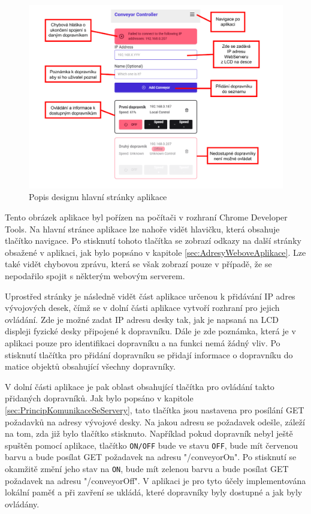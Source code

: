 \begin{figure}[H]
	\centering
	\includegraphics[width=1\linewidth]{images/LandingPage_Annot.drawio.pdf}
	\caption{Popis designu hlavní stránky aplikace}
	\label{fig:LandingPageAnnotated}
\end{figure}

Tento obrázek aplikace byl pořízen na počítači v rozhraní Chrome Developer Tools. Na hlavní stránce aplikace lze nahoře vidět hlavičku, která obsahuje tlačítko navigace. Po stisknutí tohoto tlačítka se zobrazí odkazy na další stránky obsažené v aplikaci, jak bylo popsáno v kapitole \ref{sec:AdresyWeboveAplikace}. Lze také vidět chybovou zprávu, která se však zobrazí pouze v případě, že se nepodařilo spojit s některým webovým serverem.

Uprostřed stránky je následně vidět část aplikace určenou k přidávání IP adres vývojových desek, čímž se v dolní části aplikace vytvoří rozhraní pro jejich ovládání. Zde je možné zadat IP adresu desky tak, jak je napsaná na LCD displeji fyzické desky připojené k dopravníku. Dále je zde poznámka, která je v aplikaci pouze pro identifikaci dopravníku a na funkci nemá žádný vliv. Po stisknutí tlačítka pro přidání dopravníku se přidají informace o dopravníku do matice objektů obsahující všechny dopravníky.

V dolní části aplikace je pak oblast obsahující tlačítka pro ovládání takto přidaných dopravníků. Jak bylo popsáno v kapitole \ref{sec:PrincipKomunikaceSeServery}, tato tlačítka jsou nastavena pro posílání GET požadavků na adresy vývojové desky. Na jakou adresu se požadavek odešle, záleží na tom, zda již bylo tlačítko stisknuto. Například pokud dopravník nebyl ještě spuštěn pomocí aplikace, tlačítko \texttt{ON/OFF} bude ve stavu \texttt{OFF}, bude mít červenou barvu a bude posílat GET požadavek na adresu "/conveyorOn". Po stisknutí se okamžitě změní jeho stav na \texttt{ON}, bude mít zelenou barvu a bude posílat GET požadavek na adresu "/conveyorOff". V aplikaci je pro tyto účely implementována lokální paměť a při zavření se ukládá, které dopravníky byly dostupné a jak byly ovládány.

